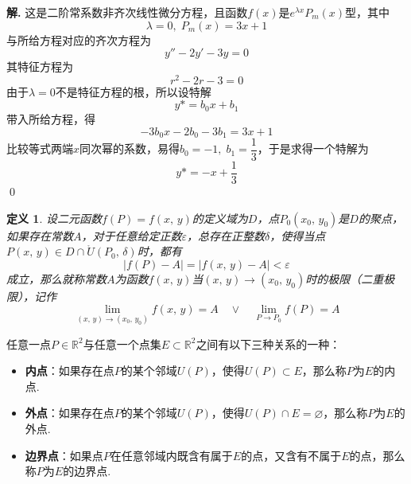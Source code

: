 \documentclass[12pt, a4paper, oneside]{ctexbook}
\newtheorem{definition}{定义}[section]
\newenvironment{solution}{\par{\textbf{解.}}\;}{\qed\par}
\def\R{\mathbb{R}} %
\def\R{\mathbb{R}} %
\begin{document}
        \begin{solution}
            这是二阶常系数非齐次线性微分方程，且函数$f(x)$是$e^{\lambda{x}}P_m(x)$型，其中
            \[
                \lambda = 0,\;P_m(x) = 3x+1
            \]
            与所给方程对应的齐次方程为
            \[
                y''-2y'-3y=0
            \]
            其特征方程为
            \[
                r^2-2r-3 = 0
            \]
            由于$\lambda = 0$不是特征方程的根，所以设特解
            \[
                y* = b_0 x + b_1
            \]
            带入所给方程，得
            \[
                -3b_0 x - 2b_0 - 3b_1 = 3x+1
            \]
            比较等式两端$x$同次幂的系数，易得$b_0 = -1,\;b_1 = \dfrac{1}{3}$，于是求得一个特解为
            \[
                y* = -x + \frac{1}{3}
            \]
        \end{solution}


        \begin{tcolorbox}[
            title=\textbf{\textcolor{white}{Definition}},
            colback=SeaGreen!10!CornflowerBlue!10,
            colframe=RoyalPurple!55!Aquamarine!100!]
            
            \begin{definition}
                设二元函数$f(P) = f(x,\,y)$的定义域为$D$，点$P_0(x_0,\,y_0)$是$D$的聚点，如果存在常数$A$，对于任意给定正数$\varepsilon$，总存在正整数$\delta$，使得当点$P(x,\,y) \in D \cap \mathring{U}(P_0,\,\delta)$时，都有
                \[
                    |f(P)-A| = |f(x,\,y) - A| < \varepsilon
                \]
                成立，那么就称常数$A$为函数$f(x,\,y)$当$(x,\,y) \to (x_0,\,y_0)$时的极限（二重极限），记作
                \[
                    \lim_{(x,\,y) \to (x_0,\,y_0)}f(x,\,y) = A \quad \lor \quad \lim_{P \to P_0}f(P) = A
                \]
            \end{definition}

        \end{tcolorbox}


        \begin{tcolorbox}[
            title = \textbf{\textcolor{white}{Proposition}},
            colback=Salmon!20, 
            colframe=Salmon!90!Black]
            
            任意一点$P \in \R^2$与任意一个点集$E \subset \R^2$之间有以下三种关系的一种：
            \begin{itemize}[leftmargin=45pt]
                \item \textbf{内点}：如果存在点$P$的某个邻域$U(P)$，使得$U(P) \subset E$，那么称$P$为$E$的内点.
                \item \textbf{外点}：如果存在点$P$的某个邻域$U(P)$，使得$U(P) \cap E = \varnothing$，那么称$P$为$E$的外点.
                \item \textbf{边界点}：如果点$P$在任意邻域内既含有属于$E$的点，又含有不属于$E$的点，那么称$P$为$E$的边界点.
            \end{itemize}

        \end{tcolorbox}
\end{document}
